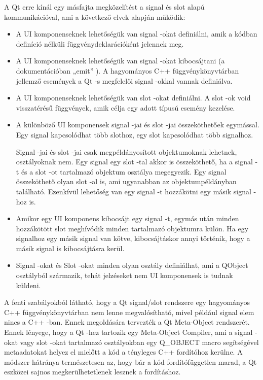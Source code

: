 A Qt erre kínál egy másfajta megközelítést a signal és slot alapú kommunikációval, 
ami a következő elvek alapján működik:

\begin{itemize}
\item A UI komponenseknek lehetőségük van signal -okat definiálni, 
amik a kódban definíció nélküli függvénydeklarációként jelennek meg.
\item A UI komponenseknek lehetőségük 
van signal -okat kibocsájtani 
(a dokumentációban „emit” \cite{qtmodelview}). 
A hagyományos C++ függvénykönyvtárban jellemző események 
a Qt -s megfelelői signal -okkal vannak definiálva.
\item A UI komponenseknek lehetőségük van slot -okat definiálni. 
A slot -ok void visszatérésű függvények, 
amik célja egy adott típusú esemény kezelése.
\item A különböző UI komponensek signal -jai és slot -jai összeköthetőek egymással. 
Egy signal kapcsolódhat több slothoz, 
egy slot kapcsolódhat több signalhoz.

Signal -jai és slot -jai csak megpéldányosított objektumoknak lehetnek, 
osztályoknak nem. 
Egy signal egy slot -tal akkor is összeköthető, 
ha a signal -t és a slot -ot tartalmazó objektum osztálya megegyezik. 
Egy signal összeköthető olyan slot -al is, 
ami ugyanabban az objektumpéldányban található. 
Ezenkívül lehetőség van egy signal -t hozzákötni egy másik signal -hoz is.
\item Amikor egy UI komponens kibocsájt egy signal -t, 
egymás után minden hozzákötött slot meghívódik 
minden tartalmazó objektumra külön. 
Ha egy signalhoz egy másik signal van kötve, kibocsájtáskor annyi történik, 
hogy a másik signal is kibocsájtásra kerül.
\item Signal -okat és Slot -okat minden olyan osztály definiálhat, 
ami a {\ttfamily QObject} osztályból származik, 
tehát jelzéseket nem UI komponensek is tudnak küldeni.
\end{itemize}

A fenti szabályokból látható, 
hogy a Qt signal/slot rendszere egy hagyományos 
C++ függvénykönyvtárban nem lenne megvalósítható, 
mivel például signal elem nincs a C++ -ban. 
Ennek megoldására tervezték a Qt Meta-Object rendszerét. 
Ennek lényege, hogy a Qt -hez tartozik egy Meta-Object Compiler, 
ami a signal -okat vagy slot -okat tartalmazó osztályokban 
egy {\ttfamily Q\_OBJECT} macro segítségével metaadatokat helyez el 
mielőtt a kód a tényleges C++ fordítóhoz kerülne. 
A módszer hátránya természetesen az, 
hogy bár a kód fordítófüggetlen marad, 
a Qt eszközei sajnos megkerülhetetlenek lesznek a fordításhoz.

